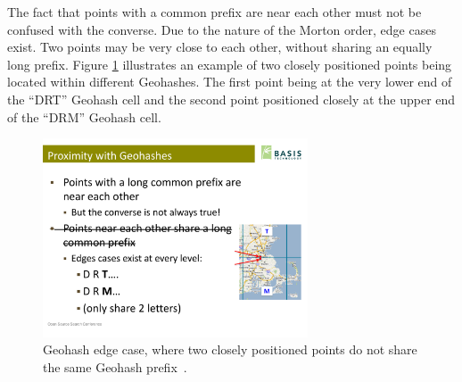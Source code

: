 The fact that points with a common prefix are near each other must not be confused with the converse. Due to the nature of the Morton order, edge cases exist. Two points may be very close to each other, without sharing an equally long prefix. Figure \ref{fig:geohash-edge} illustrates an example of two closely positioned points being located within different Geohashes. The first point being at the very lower end of the ``DRT'' Geohash cell and the second point positioned closely at the upper end of the ``DRM'' Geohash cell. 

\begin{figure}[h]
  \begin{center}
    \includegraphics[width=0.7\textwidth]{figures/geohash_edges.pdf}
    \caption{Geohash edge case, where two closely positioned points do not share the same Geohash prefix~\cite{Smiley11geohash}.}
    \label{fig:geohash-edge}
  \end{center}
\end{figure}




























